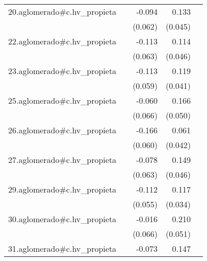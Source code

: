 {\begin{longtable}{l*{4}{D{.}{.}{-1}}}
\addlinespace
20.aglomerado#c.hv\_propieta&                     &      -0.094         &       0.133\sym{**} &                     \\
            &                     &     (0.062)         &     (0.045)         &                     \\
\addlinespace
22.aglomerado#c.hv\_propieta&                     &      -0.113         &       0.114\sym{*}  &                     \\
            &                     &     (0.063)         &     (0.046)         &                     \\
\addlinespace
23.aglomerado#c.hv\_propieta&                     &      -0.113         &       0.119\sym{**} &                     \\
            &                     &     (0.059)         &     (0.041)         &                     \\
\addlinespace
25.aglomerado#c.hv\_propieta&                     &      -0.060         &       0.166\sym{***}&                     \\
            &                     &     (0.066)         &     (0.050)         &                     \\
\addlinespace
26.aglomerado#c.hv\_propieta&                     &      -0.166\sym{**} &       0.061         &                     \\
            &                     &     (0.060)         &     (0.042)         &                     \\
\addlinespace
27.aglomerado#c.hv\_propieta&                     &      -0.078         &       0.149\sym{**} &                     \\
            &                     &     (0.063)         &     (0.046)         &                     \\
\addlinespace
29.aglomerado#c.hv\_propieta&                     &      -0.112\sym{*}  &       0.117\sym{***}&                     \\
            &                     &     (0.055)         &     (0.034)         &                     \\
\addlinespace
30.aglomerado#c.hv\_propieta&                     &      -0.016         &       0.210\sym{***}&                     \\
            &                     &     (0.066)         &     (0.051)         &                     \\
\addlinespace
31.aglomerado#c.hv\_propieta&                     &      -0.073         &       0.147\sym{**} &                     \\

\end{longtable}}
